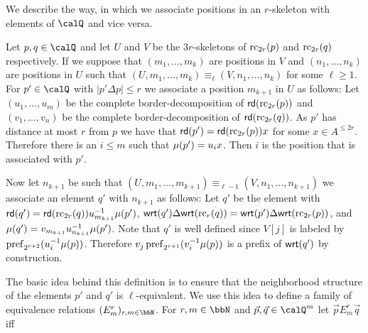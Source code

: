 We describe the way, in which we associate positions in an $r$-skeleton with elements of $\Qx$ and vice versa. 
\begin{definition}
	Let $p,q\in \Qx$ and let $U$ and $V$ be the $3r$-skeletons of $\operatorname{rc}_{2r}(p)$ and $\operatorname{rc}_{2r}(q)$ respectively. If we suppose that $(m_1,\ldots,m_k)$ are positions in $V$ and $(n_1,\ldots,n_k)$ are positions in $U$ such that $(U,m_1,\ldots,m_k) \equiv_{\ell} (V,n_1,\ldots,n_k)$ for some $\ell \geq 1$. For $p'\in \Qx$ with $|p'\Delta p| \leq r$ we associate a position $m_{k+1}$ in $U$ as follows:
	Let $(u_1,\ldots, u_m)$ be the complete border-decomposition of $\mathsf{rd}(\operatorname{rc}_{2r}(p))$ and $(v_1,\ldots,v_n)$ be the complete border-decomposition of $\mathsf{rd}(\operatorname{rc}_{2r}(q))$. As $p'$ has distance at most $r$ from $p$ we have that $\mathsf{rd}(p') = \mathsf{rd}(\operatorname{rc}_{2r}(p))x$
	for some $x\in A^{\leq 2r}$. Therefore there is an $i\leq m$ such that $\mu(p') = u_ix$. Then $i$ is the position that is associated with $p'$.
	
	Now let $n_{k+1}$ be such that $(U,m_1,\ldots,m_{k+1}) \equiv_{\ell-1} (V,n_1,\ldots,n_{k+1})$ we associate an element $q'$ with $n_{k+1}$ as follows:
	Let $q'$ be the element with $\mathsf{rd}(q') = \mathsf{rd}(\operatorname{rc}_{2r}(q))u_{m_{k+1}}^{-1}\mu(p')$, $\mathsf{wrt}(q')\Delta\mathsf{wrt}(\operatorname{rc}_r({q})) = \mathsf{wrt}(p')\Delta\mathsf{wrt}(\operatorname{rc}_{2r}({p}))$, and 
	$\mu(q') = v_{m_{k+1}}u_{n_{k+1}}^{-1}\mu(p')$. Note that $q'$ is well defined since $V[j]$ is labeled by $\operatorname{pref}_{2^{r+2}}(u_i^{-1}\mu(p))$. Therefore $v_j\operatorname{pref}_{2^{r+1}}(v_i^{-1}\mu(p))$ is a prefix of $\mathsf{wrt}(q')$ by construction.
\end{definition}
The basic idea behind this definition is to ensure that the neighborhood structure of the elements $p'$ and $q'$ is $\ell$-equivalent. We use this idea to  define a family of  equivalence relations $(E^r_m)_{r,m\in\bbN}$.
For $r,m\in \bbN$ and $\vec{p},\vec{q}\in \Qx^m$ let $\vec{p} E^r_m \vec{q}$ iff
